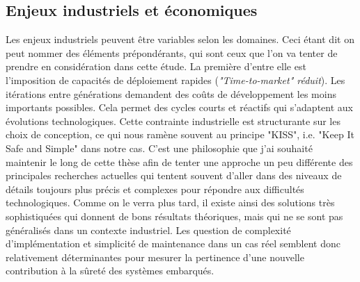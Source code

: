 \documentclass[french, a4paper, 11pt, twoside, pdftex]{StyleThese}
\begin{document}
		
		
		
	\subsection{Enjeux industriels et économiques}
		Les enjeux industriels peuvent être variables selon les domaines. Ceci étant dit on peut nommer des éléments prépondérants, qui sont ceux que l'on va tenter de prendre en considération dans cette étude. La première d'entre elle est l'imposition de capacités de déploiement rapides (\textit{"Time-to-market" réduit}). Les itérations entre générations demandent des coûts de développement les moins importants possibles. Cela permet des cycles courts et réactifs qui s'adaptent aux évolutions technologiques. Cette contrainte industrielle est structurante sur les choix de conception, ce qui nous ramène souvent au principe "KISS", i.e. "Keep It Safe and Simple" dans notre cas. C'est une philosophie que j'ai souhaité maintenir le long de cette thèse afin de tenter une approche un peu différente des principales recherches actuelles qui tentent souvent d'aller dans des niveaux de détails toujours plus précis et complexes pour répondre aux difficultés technologiques. Comme on le verra plus tard, il existe ainsi des solutions très sophistiquées qui donnent de bons résultats théoriques, mais qui ne se sont pas généralisés dans un contexte industriel. Les question de complexité d'implémentation et simplicité de maintenance dans un cas réel semblent donc relativement déterminantes pour mesurer la pertinence d'une nouvelle contribution à la sûreté des systèmes embarqués.
\end{document}
